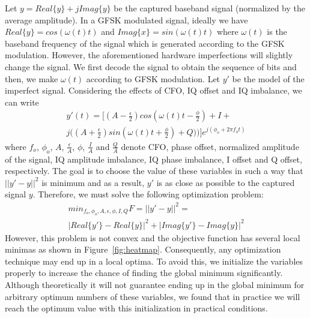 Let $y = Real\{y\}+jImag\{y\}$ be the captured baseband signal (normalized by the average amplitude). In a GFSK modulated signal, ideally we have $Real\{y\} = cos(\omega(t)t)$ and $Imag\{x\} = sin(\omega(t)t)$ where $\omega(t)$ is the baseband frequency of the signal which is generated according to the GFSK modulation. However, the aforementioned hardware imperfections will slightly change the signal. We first decode the signal to obtain the sequence of bits and then, we make $\omega(t)$ according to GFSK modulation. Let $y'$ be the model of the imperfect signal. Considering the effects of CFO, IQ offset and IQ imbalance, we can write
\begin{gather*}
    y'(t) = \big[(A-\frac{\epsilon}{2})cos(\omega(t)t-\frac{\phi}{2})+I+ \\
    j\big((A+\frac{\epsilon}{2})sin(\omega(t)t+\frac{\phi}{2})+Q)\big)\big]e^{j(\phi_o+2\pi f_o t)}
\end{gather*}
where $f_o$, $\phi_o$, $A$, $\frac{\epsilon}{A}$, $\phi$, $\frac{I}{A}$ and $\frac{Q}{A}$ denote CFO, phase offset, normalized amplitude of the signal, IQ amplitude imbalance, IQ phase imbalance, I offset and Q offset, respectively. The goal is to choose the value of these variables in such a way that $||y'-y||^2$ is minimum and as a result, $y'$ is as close as possible to the captured signal $y$. Therefore, we must solve the following optimization problem:
\begin{gather*}
    min_{f_o,\phi_o,A,\epsilon,\phi,I,Q}{F=||y'-y||^2 =} \\ |Real\{y'\}-Real\{y\}|^2+|Imag\{y'\}-Imag\{y\}|^2
\end{gather*}
However, this problem is not convex and the objective function has several local minimas as shown in Figure~\ref{fig:heatmap}. Consequently, any optimization technique may end up in a local optima. To avoid this, we initialize the variables properly to increase the chance of finding the global minimum significantly. Although theoretically it will not guarantee ending up in the global minimum for arbitrary optimum numbers of these variables, we found that in practice we will reach the optimum value with this initialization in practical conditions. 

